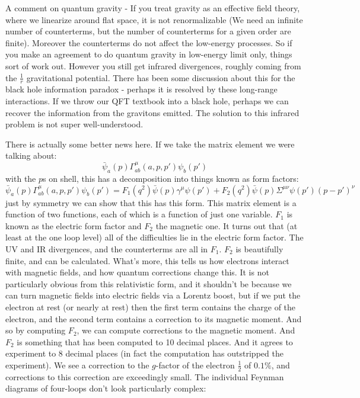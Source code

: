 A comment on quantum gravity - If you treat gravity as an effective field theory, where we linearize around flat space, it is not renormalizable (We need an infinite number of counterterms, but the number of counterterms for a given order are finite). Moreover the counterterms do not affect the low-energy processes. So if you make an agreement to do quantum gravity in low-energy limit only, things sort of work out. However you still get infrared divergences, roughly coming from the $\frac{1}{r}$ gravitational potential. There has been some discussion about this for the black hole information paradox - perhaps it is resolved by these long-range interactions. If we throw our QFT textbook into a black hole, perhaps we can recover the information from the gravitons emitted. The solution to this infrared problem is not super well-understood.

There is actually some better news here. If we take the matrix element we were talking about:
\begin{equation}
    \bar{\psi}_a(p)\Gamma^\mu_{ab}(a, p, p')\psi_b(p')
\end{equation}
with the $p$s on shell, this has a decomposition into things known as form factors:
\begin{equation}
    \bar{\psi}_a(p)\Gamma^\mu_{ab}(a, p, p')\psi_b(p') = F_1(q^2)\bar{\psi}(p)\gamma^\mu \psi(p') + F_2(q^2)\bar{\psi}(p)\Sigma^{\mu\nu}\psi(p') (p - p')^\nu
\end{equation}
just by symmetry we can show that this has this form. This matrix element is a function of two functions, each of which is a function of just one variable. $F_1$ is known as the electric form factor and $F_2$ the magnetic one. It turns out that (at least at the one loop level) all of the difficulties lie in the electric form factor. The UV and IR divergences, and the counterterms are all in $F_1$. $F_2$ is beautifully finite, and can be calculated. What's more, this tells us how electrons interact with magnetic fields, and how quantum corrections change this. It is not particularly obvious from this relativistic form, and it shouldn't be because we can turn magnetic fields into electric fields via a Lorentz boost, but if we put the electron at rest (or nearly at rest) then the first term contains the charge of the electron, and the second term contains a correction to its magnetic moment. And so by computing $F_2$, we can compute corrections to the magnetic moment. And $F_2$ is something that has been computed to 10 decimal places. And it agrees to experiment to 8 decimal places (in fact the computation has outstripped the experiment). We see a correction to the $g$-factor of the electron $\frac{1}{2}$ of $0.1\%$, and corrections to this correction are exceedingly small. The individual Feynman diagrams of four-loops don't look particularly complex:

